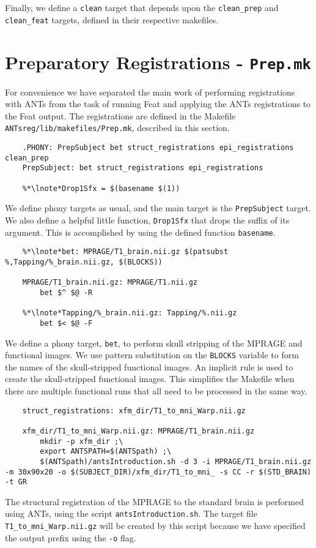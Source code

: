 Finally, we define a \texttt{clean} target that depends upon the
\texttt{clean_prep} and \texttt{clean_feat} targets, defined in their
respective makefiles.

\section{Preparatory Registrations - \texttt{Prep.mk}}

For convenience we have separated the main work of performing
registrations with ANTs from the task of running Feat and applying the
ANTs registrations to the Feat output. The registrations are defined
in the Makefile \texttt{ANTsreg/lib/makefiles/Prep.mk}, described in
this section.

\begin{lstlisting}
	.PHONY: PrepSubject bet struct_registrations epi_registrations clean_prep
	PrepSubject: bet struct_registrations epi_registrations 

	%*\lnote*Drop1Sfx = $(basename $(1))
\end{lstlisting}
We define phony targets as usual, and the main target is the
\texttt{PrepSubject} target.  We also define a helpful little
function, \texttt{Drop1Sfx} that drops the suffix of its
argument. This is accomplished by using the \maken{} defined function
\texttt{basename}. 

\begin{lstlisting}
	%*\lnote*bet: MPRAGE/T1_brain.nii.gz $(patsubst %,Tapping/%_brain.nii.gz, $(BLOCKS))

	MPRAGE/T1_brain.nii.gz: MPRAGE/T1.nii.gz
		bet $^ $@ -R

	%*\lnote*Tapping/%_brain.nii.gz: Tapping/%.nii.gz
		bet $< $@ -F
\end{lstlisting}

We define a phony target, \texttt{bet}, to perform skull stripping of
the MPRAGE and functional images.  We use pattern substitution
on the \texttt{BLOCKS} variable to form the names of the
skull-stripped functional images.  An implicit rule is used to
create the skull-stripped functional images. This simplifies the
Makefile when there are multiple functional runs that all need to be
processed in the same way.

\begin{lstlisting}
	struct_registrations: xfm_dir/T1_to_mni_Warp.nii.gz

	xfm_dir/T1_to_mni_Warp.nii.gz: MPRAGE/T1_brain.nii.gz 
		mkdir -p xfm_dir ;\
		export ANTSPATH=$(ANTSpath) ;\
		$(ANTSpath)/antsIntroduction.sh -d 3 -i MPRAGE/T1_brain.nii.gz -m 30x90x20 -o $(SUBJECT_DIR)/xfm_dir/T1_to_mni_ -s CC -r $(STD_BRAIN) -t GR
\end{lstlisting}
The structural registration of the MPRAGE to the standard brain is
performed using ANTs, using the script
\texttt{antsIntroduction.sh}. The target file
\texttt{T1_to_mni_Warp.nii.gz} will be created by this script because
we have specified the output prefix using the \texttt{-o} flag.

